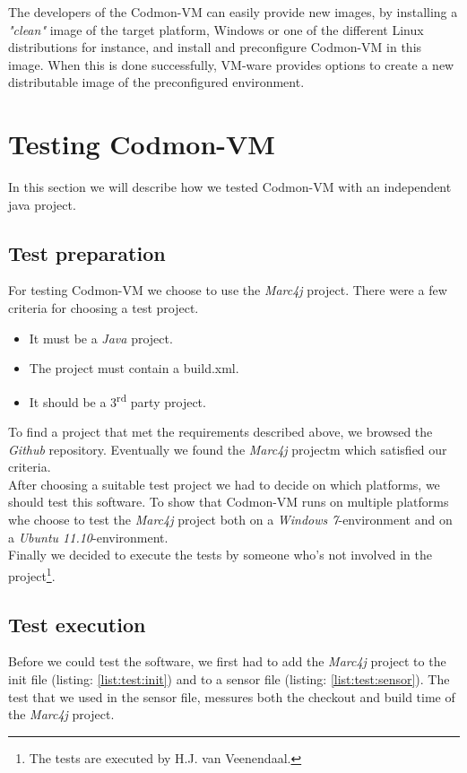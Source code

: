 \documentclass{article}
\newcommand{\project}{Codmon-VM}
\begin{document}
\noindent The developers of the \project{} can easily provide new images, by installing a \emph{"clean"} image of the target platform, Windows or one of the different Linux distributions for instance, and 
install and preconfigure \project{} in this image. When this is done successfully, VM-ware provides options to create a new distributable image of the preconfigured environment. 

\newpage
\section{Testing \project{}}
\label{test}
In this section we will describe how we tested \project{} with an independent java project.

\subsection{Test preparation}
\label{test:prep}
For testing \project{} we choose to use the \emph{Marc4j}\cite{marc4j} project. There were a few criteria for choosing a test project.

\begin{itemize}
\item It must be a \emph{Java} project.
\item The project must contain a build.xml.
\item It should be a 3\textsuperscript{rd} party project.
\end{itemize} 

\noindent To find a project that met the requirements described above, we browsed the \emph{Github}\cite{Github} repository. Eventually we found the \emph{Marc4j} projectm which satisfied our criteria.\\

\noindent After choosing a suitable test project we had to decide on which platforms, we should test this software. To show that \project{} runs on multiple platforms whe choose to test the \emph{Marc4j} 
project both on a \emph{Windows 7}-environment and on a \emph{Ubuntu 11.10}-environment.\\

\noindent Finally we decided to execute the tests by someone who's not involved in the project\footnote{The tests are executed by H.J. van Veenendaal.}.

\subsection{Test execution}
\label{test:exec}
Before we could test the software, we first had to add the \emph{Marc4j} project to the init file (listing: \ref{list:test:init}) and to a sensor file (listing: \ref{list:test:sensor}). The test that we used in 
the sensor file, messures both the checkout and build time of the \emph{Marc4j} project.
\end{document}
